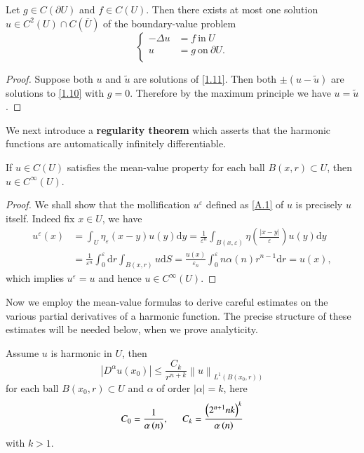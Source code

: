 \begin{proposition}
Let $g\in C(\partial U)$ and $f\in C(U)$. Then there exists at most one solution $u\in C^2(U)\cap C(\overline{U})$ of the boundary-value problem 
\begin{equation}\label{1.11}
\left\{ \begin{aligned}
	-\Delta u&=f\ \text{in}\ U\\
	u&=g\ \text{on}\ \partial U.\\
\end{aligned} \right. 
\end{equation}
\end{proposition}
\begin{proof}
Suppose both $u$ and $\widetilde{u}$ are solutions of \eqref{1.11}. Then both $\pm(u-\widetilde{u})$ are solutions to \eqref{1.10} with $g=0$. Therefore by the maximum principle we have $u=\widetilde{u}$.
\end{proof}
We next introduce a \textbf{regularity theorem} which asserts that the harmonic functions are automatically infinitely differentiable.
\begin{theorem}\label{Thm1.2.9}
If $u\in C(U)$ satisfies the mean-value property for each ball $B(x,r)\subset U$, then $u\in C^\infty(U)$.
\end{theorem}
\begin{proof}
We shall show that the mollification $u^\varepsilon$ defined as \eqref{A.1} of $u$ is precisely $u$ itself. Indeed fix $x\in U$, we have 
$$
\begin{aligned}
u^{\varepsilon}\left( x \right) &=\int_U{\eta _{\varepsilon}\left( x-y \right) u\left( y \right) \mathrm{d}y}=\frac{1}{\varepsilon ^n}\int_{B\left( x,\varepsilon \right)}{\eta \left( \frac{\left| x-y \right|}{\varepsilon} \right) u\left( y \right) \mathrm{d}y}
\\
&=\frac{1}{\varepsilon ^n}\int_0^{\varepsilon}{\mathrm{d}r\int_{B\left( x,r \right)}{u\mathrm{d}S}}=\frac{u\left( x \right)}{\varepsilon _n}\int_0^{\varepsilon}{n\alpha \left( n \right) r^{n-1}\mathrm{d}r}=u\left( x \right) ,
\end{aligned}
$$
which implies $u^\varepsilon=u$ and hence $u\in C^\infty(U)$.
\end{proof}
Now we employ the mean-value formulas to derive careful estimates on the various partial derivatives of a harmonic function. The precise structure of these estimates will be needed below, when we prove analyticity.
\begin{proposition}
Assume $u$ is harmonic in $U$, then 
$$
\left| D^{\alpha}u\left( x_0 \right) \right|\le \frac{C_k}{r^{n+k}}\left\| u \right\| _{L^1\left( B\left( x_0,r \right) \right)}
$$
for each ball $B(x_0,r)\subset U$ and $\alpha$ of order $|\alpha|=k$, here 
$$
C_0=\frac{1}{\alpha \left( n \right)},\hspace{0.5cm}C_k=\frac{\left( 2^{n+1}nk \right) ^k}{\alpha \left( n \right)}
$$
with $k>1$.
\end{proposition}
